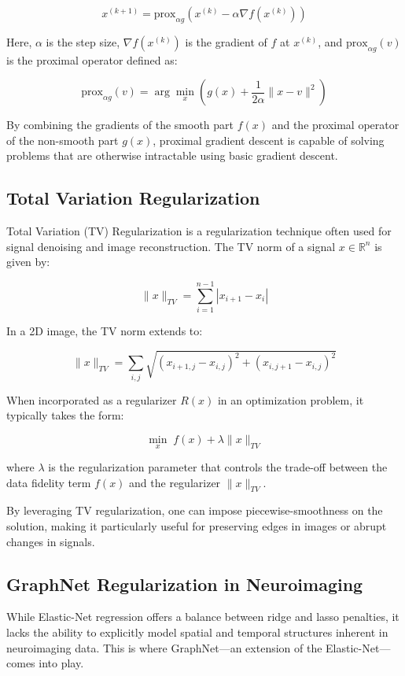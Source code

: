 \[
x^{(k+1)} = \text{prox}_{\alpha g} \left( x^{(k)} - \alpha \nabla f(x^{(k)}) \right)
\]

Here, \( \alpha \) is the step size, \( \nabla f(x^{(k)}) \) is the gradient of \( f \) at \( x^{(k)} \), and \( \text{prox}_{\alpha g}(v) \) is the proximal operator defined as:

\[
\text{prox}_{\alpha g}(v) = \arg\min_{x} \left( g(x) + \frac{1}{2\alpha} \| x - v \|^2 \right)
\]

By combining the gradients of the smooth part \( f(x) \) and the proximal operator of the non-smooth part \( g(x) \), proximal gradient descent is capable of solving problems that are otherwise intractable using basic gradient descent.

\subsection{Total Variation Regularization}

Total Variation (TV) Regularization is a regularization technique often used for signal denoising and image reconstruction. The TV norm of a signal \( x \in \mathbb{R}^n \) is given by:

\[
\| x \|_{TV} = \sum_{i=1}^{n-1} |x_{i+1} - x_i|
\]

In a 2D image, the TV norm extends to:

\[
\| x \|_{TV} = \sum_{i,j} \sqrt{(x_{i+1,j} - x_{i,j})^2 + (x_{i,j+1} - x_{i,j})^2}
\]

When incorporated as a regularizer \( R(x) \) in an optimization problem, it typically takes the form:

\[
\min_{x} \; f(x) + \lambda \| x \|_{TV}
\]

where \( \lambda \) is the regularization parameter that controls the trade-off between the data fidelity term \( f(x) \) and the regularizer \( \| x \|_{TV} \).

By leveraging TV regularization, one can impose piecewise-smoothness on the solution, making it particularly useful for preserving edges in images or abrupt changes in signals.

\subsection{GraphNet Regularization in Neuroimaging}

While Elastic-Net regression offers a balance between ridge and lasso penalties, it lacks the ability to explicitly model spatial and temporal structures inherent in neuroimaging data.
This is where GraphNet—an extension of the Elastic-Net—comes into play.

